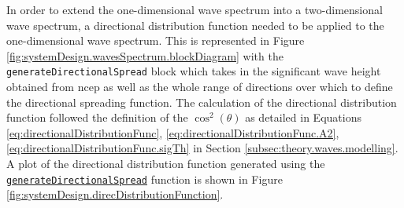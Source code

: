 In order to extend the one-dimensional wave spectrum into a two-dimensional wave spectrum, a directional distribution function needed to be applied to the one-dimensional wave spectrum. This is represented in Figure \ref{fig:systemDesign.wavesSpectrum.blockDiagram} with the \lstinline{generateDirectionalSpread} block which takes in the significant wave height obtained from \acs{ncep} as well as the whole range of directions over which to define the directional spreading function. The calculation of the directional distribution function followed the definition of the $\cos^2(\theta)$ as detailed in Equations \ref{eq:directionalDistributionFunc}, \ref{eq:directionalDistributionFunc.A2}, \ref{eq:directionalDistributionFunc.sigTh} in Section \ref{subsec:theory.waves.modelling}. A plot of the directional distribution function generated using the \href{https://github.com/JNSRYA006/sar-parameter-extraction-pipeline/blob/main/functions/waveSpectra/generateDirectionalDistribution.m}{\lstinline{generateDirectionalSpread}} function is shown in Figure \ref{fig:systemDesign.direcDistributionFunction}.






                    
